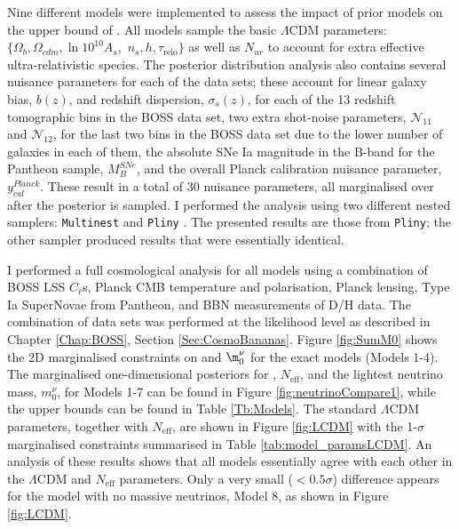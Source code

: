  Nine different models were implemented to assess the impact of prior models on the upper bound of \NM{}. All models sample the basic $\Lambda$CDM parameters: $\{\Omega_b, \Omega_{cdm}, \ln 10^{10}A_s,$ $ n_s, h, \tau_{\text{reio}}\}$ as well as $N_{ur}$ to account for extra effective ultra-relativistic species. The posterior distribution analysis also contains several nuisance parameters for each of the data sets; these account for linear galaxy bias, $b(z)$, and redshift dispersion, $\sigma_s(z)$, for each of the 13 redshift tomographic bins in the BOSS data set, two extra shot-noise parameters, $\mathcal{N}_{11}$ and  $\mathcal{N}_{12}$, for the last two bins in the BOSS data set due to the lower number of galaxies in each of them, the absolute SNe Ia magnitude in the B-band for the Pantheon sample, $M_B^{SNe}$, and the overall Planck calibration nuisance parameter, $y_{cal}^{Planck}$. These result in a total of 30 nuisance parameters, all marginalised over after the posterior is sampled. I performed the analysis using two different nested samplers: \texttt{Multinest} \citep{2009Multinest} and \texttt{Pliny} \citep{PlinyRichardThesis}. The presented results are those from \texttt{Pliny}; the other sampler produced results that were essentially identical. %
 
 
\qquad I performed a full cosmological analysis for all models using a combination of BOSS LSS $C_{\ell}$s, Planck CMB temperature and polarisation, Planck lensing, Type Ia SuperNovae from Pantheon, and BBN measurements of D/H data. The combination of data sets was performed at the likelihood level as described in Chapter \ref{Chap:BOSS}, Section \ref{Sec:CosmoBananas}. Figure \ref{fig:SumM0} shows the 2D marginalised constraints on \NM{} and $\m_0^{\nu}$ for the exact models (Models 1-4). The marginalised one-dimensional posteriors for \NM{}, $N_{\text{eff}}$, and the lightest neutrino mass, $m_{0}^{\nu}$, for Models 1-7 can be found in Figure \ref{fig:neutrinoCompare1}, while the upper bounds can be found in Table \ref{Tb:Models}. The standard $\Lambda$CDM parameters, together with $N_{\text{eff}}$, are shown in Figure \ref{fig:LCDM} with the 1-$\sigma$ marginalised constraints summarised in Table \ref{tab:model_paramsLCDM}. An analysis of these results shows that all models essentially agree with each other in the $\Lambda$CDM and $N_{\text{eff}}$ parameters. Only a very small ($< 0.5 \sigma$) difference appears for the model with no massive neutrinos, Model 8, as shown in Figure \ref{fig:LCDM}.

